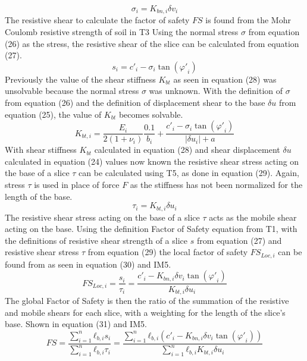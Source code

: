 \documentclass[12pt]{article}
\begin{document}
\begin{dmath}
σ_{i}={K_{bn,i}} {δv}_{i}
\end{dmath}
The resistive shear to calculate the factor of safety $FS$ is found from the Mohr Coulomb resistive strength of soil in T3 Using the normal stress $σ$ from equation (26) as the stress, the resistive shear of the slice can be calculated from equation (27).
\begin{dmath}
s_{i}={c'}_{i}-σ_{i} \tan\left({φ'}_{i}\right)
\end{dmath}
Previously the value of the shear stiffness ${K_{bt}}$ as seen in equation (28) was unsolvable because the normal stress $σ$ was unknown. With the definition of $σ$ from equation (26) and the definition of displacement shear to the base $δu$ from equation (25), the value of ${K_{bt}}$ becomes solvable.
\begin{dmath}
{K_{bt,i}}=\frac{E_{i}}{2 \left(1+ν_{i}\right)} \frac{0.1}{b_{i}}+\frac{{c'}_{i}-σ_{i} \tan\left({φ'}_{i}\right)}{|{δu}_{i}|+a}
\end{dmath}
With shear stiffness ${K_{bt}}$ calculated in equation (28) and shear displacement $δu$ calculated in equation (24) values now known the resistive shear stress acting on the base of a slice $τ$ can be calculated using T5, as done in equation (29). Again, stress $τ$ is used in place of force $F$ as the stiffness has not been normalized for the length of the base.
\begin{dmath}
τ_{i}={K_{bt,i}} {δu}_{i}
\end{dmath}
The resistive shear stress acting on the base of a slice $τ$ acts as the mobile shear acting on the base. Using the definition Factor of Safety equation from T1, with the definitions of resistive shear strength of a slice $s$ from equation (27) and resistive shear stress $τ$ from equation (29) the local factor of safety ${FS_{Loc,i}}$ can be found from as seen in equation (30) and IM5.
\begin{dmath}
{FS_{Loc,i}}=\frac{s_{i}}{τ_{i}}=\frac{{c'}_{i}-{K_{bn,i}} {δv}_{i} \tan\left({φ'}_{i}\right)}{{K_{bt,i}} {δu}_{i}}
\end{dmath}
The global Factor of Safety is then the ratio of the summation of the resistive and mobile shears for each slice, with a weighting for the length of the slice's base. Shown in equation (31) and IM5.
\begin{dmath}
FS=\frac{\displaystyle\sum_{i=1}^{n}{{ℓ_{b,i}} s_{i}}}{\displaystyle\sum_{i=1}^{n}{{ℓ_{b,i}} τ_{i}}}=\frac{\displaystyle\sum_{i=1}^{n}{{ℓ_{b,i}} \left({c'}_{i}-{K_{bn,i}} {δv}_{i} \tan\left({φ'}_{i}\right)\right)}}{\displaystyle\sum_{i=1}^{n}{{ℓ_{b,i}} {K_{bt,i}} {δu}_{i}}}
\end{dmath}
\end{document}
